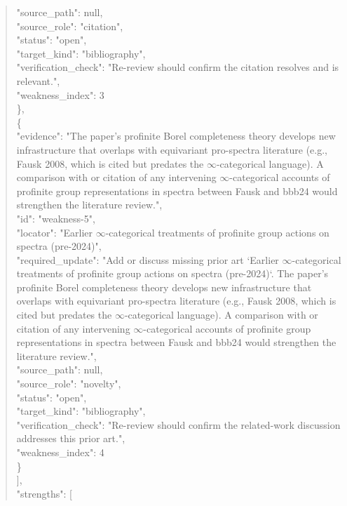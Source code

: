 \documentclass[11pt]{article}
\begin{document}
\begin{quote}
      "source\_path": null,\\
      "source\_role": "citation",\\
      "status": "open",\\
      "target\_kind": "bibliography",\\
      "verification\_check": "Re-review should confirm the citation resolves and is relevant.",\\
      "weakness\_index": 3\\
    \},\\
    \{\\
      "evidence": "The paper's profinite Borel completeness theory develops new infrastructure that overlaps with equivariant pro-spectra literature (e.g., Fausk 2008, which is cited but predates the \ensuremath{\infty}-categorical language). A comparison with or citation of any intervening \ensuremath{\infty}-categorical accounts of profinite group representations in spectra between Fausk and bbb24 would strengthen the literature review.",\\
      "id": "weakness-5",\\
      "locator": "Earlier \ensuremath{\infty}-categorical treatments of profinite group actions on spectra (pre-2024)",\\
      "required\_update": "Add or discuss missing prior art `Earlier \ensuremath{\infty}-categorical treatments of profinite group actions on spectra (pre-2024)`. The paper's profinite Borel completeness theory develops new infrastructure that overlaps with equivariant pro-spectra literature (e.g., Fausk 2008, which is cited but predates the \ensuremath{\infty}-categorical language). A comparison with or citation of any intervening \ensuremath{\infty}-categorical accounts of profinite group representations in spectra between Fausk and bbb24 would strengthen the literature review.",\\
      "source\_path": null,\\
      "source\_role": "novelty",\\
      "status": "open",\\
      "target\_kind": "bibliography",\\
      "verification\_check": "Re-review should confirm the related-work discussion addresses this prior art.",\\
      "weakness\_index": 4\\
    \}\\
  ],\\
  "strengths": [\\

\end{quote}
\end{document}
